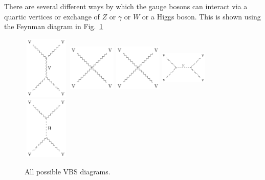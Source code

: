 There are several different ways by which the gauge bosons can interact via a quartic vertices or exchange of $Z$ or $\gamma$ or $W$ or a Higgs boson. This is shown using the Feynman diagram in Fig.~\ref{fig:VBF_vv_all}
\begin{figure}[!htbp]
    \centering
    \includegraphics[width=0.20\textwidth,height=3cm]{figures/Intro/VV_Scattering_diagrams_1.png}%
    \includegraphics[width=0.20\textwidth,height=3cm]{figures/Intro/VV_Scattering_diagrams_2.png}%
    \includegraphics[width=0.20\textwidth,height=3cm]{figures/Intro/VV_Scattering_diagrams_3.png}%
    \includegraphics[width=0.20\textwidth,height=3cm]{figures/Intro/VV_Scattering_diagrams_4.png}%
    \includegraphics[width=0.20\textwidth,height=3cm]{figures/Intro/VV_Scattering_diagrams_5.png}
    \caption{All possible VBS diagrams.}
    \label{fig:VBF_vv_all}
\end{figure}

